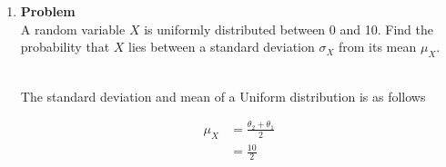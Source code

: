 \documentclass[12pt]{article}
\newenvironment{Ex}{\textbf{Problem}\vspace{.75em}\\}{}
\begin{document}
\begin{enumerate}
\begin{Ex}
\begin{solution}
      \begin{enumerate}
      \item We must find $1 - P(X \ge 5.2) + P(X \le 4.8)$.
        \begin{equation}
          \label{eq:4a-sol}
          \begin{aligned}
            1 - P(X \ge 5.2) + P(X \le 4.8) &= 1-P(X \le 4.8) + (1-P(X
            \le 4.8)) \\
            &= 2-2P(X \le 4.8) \\
            \implies P(X \ge 5.2) + P(X \le 4.8) &= 0.3714.
          \end{aligned}
        \end{equation}
      \item The probability that a bolt is not defective is the
        complement of our result in \cref{eq:4a-sol} ($0.6286$). The
        probability that all ten bolts will not be defective is
        \begin{equation}
          \label{eq:4b-sol}
          \begin{aligned}
            P(\text{none defective}) &= {10 \choose 10}
            (0.6826)^{10}(1-0.6826)^0 \\
            &= 0.6826^{10} \\
            \implies P(\text{none defective}) &= 0.0219 \\
          \end{aligned}
        \end{equation}
      \end{enumerate}
    \end{solution}
  \end{Ex}
\item
  \begin{Ex}
    A random variable $X$ is uniformly distributed between 0 and
    10. Find the probability that $X$ lies between a standard deviation
    $\sigma_X$ from its mean $\mu_X$.
    \begin{solution} \hfill \vspace{.75em}\\
      The standard deviation and mean of a Uniform distribution is as
      follows
      \begin{multicols}{2}
        \begin{equation}
          \label{eq:5-dev}
          \begin{aligned}
            \mu_X &= \frac{\theta_2 + \theta_1}{2} \\
            &= \frac{10}{2} \\

\end{aligned}
\end{equation}
\end{multicols}
\end{solution}
\end{Ex}
\end{enumerate}
\end{document}
